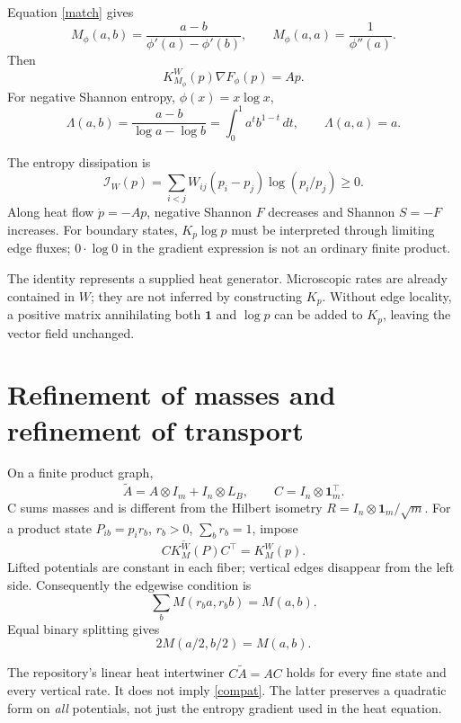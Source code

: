 \documentclass[11pt,a4paper]{article}
\newcommand{\one}{\mathbf1}
\begin{document}
Equation \eqref{match} gives
\[
M_\phi(a,b)=\frac{a-b}{\phi'(a)-\phi'(b)},\qquad
M_\phi(a,a)=\frac1{\phi''(a)}.
\]
Then
\[
K_{M_\phi}^W(p)\nabla F_\phi(p)=Ap.
\]
For negative Shannon entropy, \(\phi(x)=x\log x\),
\begin{equation}
\Lambda(a,b)=\frac{a-b}{\log a-\log b}
=\int_0^1 a^t b^{1-t}\,dt,\qquad \Lambda(a,a)=a. \label{mean}
\end{equation}

The entropy dissipation is
\begin{equation}
\mathcal I_W(p)=
\sum_{i<j}W_{ij}(p_i-p_j)\log(p_i/p_j)\ge0. \label{diss}
\end{equation}
Along heat flow \(\dot p=-Ap\), negative Shannon \(F\) decreases and Shannon
\(S=-F\) increases. For boundary states, \(K_p\log p\) must be interpreted
through limiting edge fluxes; \(0\cdot\log0\) in the gradient expression is
not an ordinary finite product.

The identity represents a supplied heat generator. Microscopic rates are
already contained in \(W\); they are not inferred by constructing \(K_p\).
Without edge locality, a positive matrix annihilating both \(\one\) and
\(\log p\) can be added to \(K_p\), leaving the vector field unchanged.

\section{Refinement of masses and refinement of transport}

On a finite product graph,
\[
\widetilde A=A\otimes I_m+I_n\otimes L_B,\qquad
C=I_n\otimes\one_m^\top.
\]
C sums masses and is different from the Hilbert isometry
\(R=I_n\otimes\one_m/\sqrt m\). For a product state
\(P_{ib}=p_i r_b\), \(r_b>0\), \(\sum_b r_b=1\), impose
\begin{equation}
C K^{\widetilde W}_M(P)C^\top=K_M^W(p). \label{compat}
\end{equation}
Lifted potentials are constant in each fiber; vertical edges disappear from
the left side. Consequently the edgewise condition is
\begin{equation}
\sum_bM(r_ba,r_bb)=M(a,b). \label{split}
\end{equation}
Equal binary splitting gives
\begin{equation}
2M(a/2,b/2)=M(a,b). \label{binary}
\end{equation}

The repository's linear heat intertwiner \(C\widetilde A=AC\) holds for
every fine state and every vertical rate. It does not imply
\eqref{compat}. The latter preserves a quadratic form on \emph{all}
potentials, not just the entropy gradient used in the heat equation.
\end{document}
